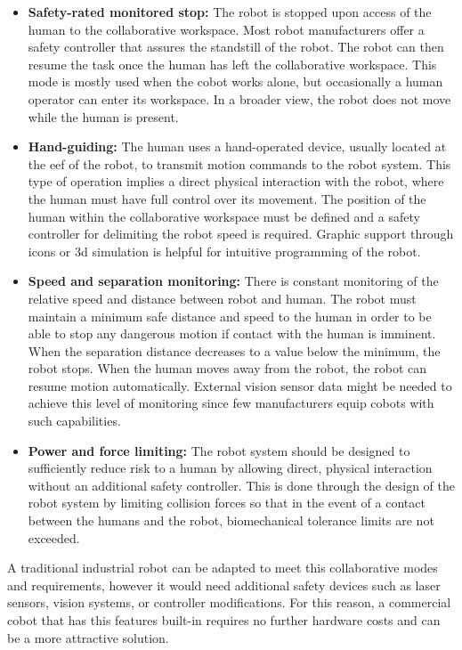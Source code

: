 \begin{itemize}
    \item \textbf{Safety-rated monitored stop: }The robot is stopped upon access of the human to the collaborative workspace. Most robot manufacturers offer a safety controller that assures the standstill of the robot. The robot can then resume the task once the human has left the collaborative workspace. This mode is mostly used when the cobot works alone, but occasionally a human operator can enter its workspace. In a broader view, the robot does not move while the human is present.
    \item \textbf{Hand-guiding: }The human uses a hand-operated device, usually located at the \ac{eef} of the robot, to transmit motion commands to the robot system. This type of operation implies a direct physical interaction with the robot, where the human must have full control over its movement. The position of the human within the collaborative workspace must be defined and a safety controller for delimiting the robot speed is required. Graphic support through icons or \acs{3d} simulation is helpful for intuitive programming of the robot.
    \item \textbf{Speed and separation monitoring: }There is constant monitoring of the relative speed and distance between robot and human. The robot must maintain a minimum safe distance and speed to the human in order to be able to stop any dangerous motion if contact with the human is imminent. When the separation distance decreases to a value below the minimum, the robot stops. When the human moves away from the robot, the robot can resume motion automatically. External vision sensor data might be needed to achieve this level of monitoring since few manufacturers equip cobots with such capabilities. 
    \item \textbf{Power and force limiting: }The robot system should be designed to sufficiently reduce risk to a human by allowing direct, physical interaction without an additional safety controller. This is done through the design of the robot system by limiting collision forces so that in the event of a contact between the humans and the robot, biomechanical tolerance limits are not exceeded.
\end{itemize}

\par A traditional industrial robot can be adapted to meet this collaborative modes and requirements, however it would need additional safety devices such as laser sensors, vision systems, or controller modifications. For this reason, a commercial cobot that has this features built-in requires no further hardware costs and can be a more attractive solution.



